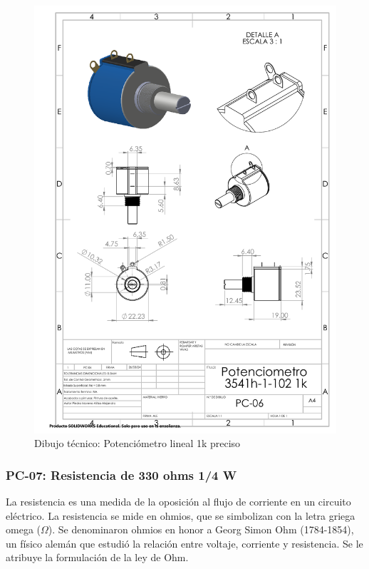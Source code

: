     \begin{figure}[H]
        \centering
        \includegraphics[trim = {7mm 1mm 1mm 1mm},clip,scale=0.4]{22/Img/potenciometroDibujo.PDF}
        \caption{Dibujo técnico: Potenciómetro lineal 1k preciso}
        \label{fig:potenciometro}
    \end{figure}
    
    
    \subsubsection{PC-07: Resistencia de 330 ohms 1/4 W }
    La resistencia es una medida de la oposición al flujo de corriente en un circuito eléctrico. La resistencia se mide en ohmios, que se simbolizan con la letra griega omega ($\Omega$). Se denominaron ohmios en honor a Georg Simon Ohm (1784-1854), un físico alemán que estudió la relación entre voltaje, corriente y resistencia. Se le atribuye la formulación de la ley de Ohm.
    
